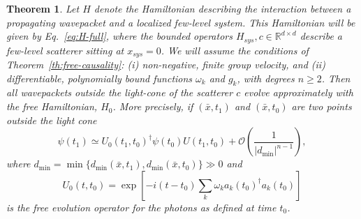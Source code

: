 \documentclass[notitlepage, prx, preprint, amsmath,superscriptaddress,amssymb]{revtex4-1}
\newtheorem{theorem}{Theorem}[section]
\begin{document}
\begin{theorem}\label{th:int_evol}
Let $H$ denote the Hamiltonian describing the interaction between a propagating wavepacket and a localized few-level system. This Hamiltonian will be given by Eq.\ \ref{eq:H-full}, where the bounded operators $H_{sys},c\in \mathbb{R}^{d\times d}$ describe a few-level scatterer sitting at $x_{sys}=0$. We will assume the conditions of Theorem\ \ref{th:free-causality}: (i) {\color{red}non-negative}, finite group velocity, and (ii) differentiable, polynomially bound functions $\omega_k$ and $g_k$, with degrees $n\geq 2$. Then all wavepackets outside the light-cone of the scatterer $c$ evolve approximately with the free Hamiltonian, $H_0$. More precisely, if $(\bar x,t_1)$ and $(\bar x,t_0)$ are two points outside the light cone
\begin{equation}
\psi(t_1) \simeq U_0(t_1,t_0)^\dagger\psi(t_0)U(t_1,t_0)
+\mathcal{O}\left(\frac{1}{|d_\text{min}|^{n-1}}\right),
\end{equation}
where $d_\text{min} = \min \{d_\text{min}(\bar x,t_1),d_\text{min}(\bar x,t_0)\}\gg 0$ and
\begin{equation}
U_0(t,t_0) = \exp\left[-i(t-t_0)\sum_k\omega_k a_k(t_0)^\dagger a_k(t_0)\right]
\end{equation}
is the free evolution operator for the photons as defined at time $t_0$.
\end{theorem}
\end{document}
